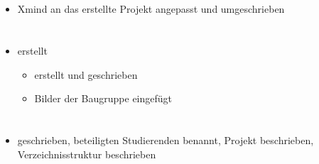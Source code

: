 	
	
\section{}
	\begin{itemize}
	\item Xmind an das erstellte Projekt angepasst und umgeschrieben
    \end{itemize}
	
	
	
\section{}
\begin{itemize}
	\item {} erstellt
	\begin{itemize}
		\item {} erstellt und geschrieben
		\item Bilder der Baugruppe eingefügt
	\end{itemize}
\end{itemize}

	
	
\section{}
	\begin{itemize}
	\item {} geschrieben, beteiligten Studierenden benannt, Projekt beschrieben, Verzeichnisstruktur beschrieben
    \end{itemize}
